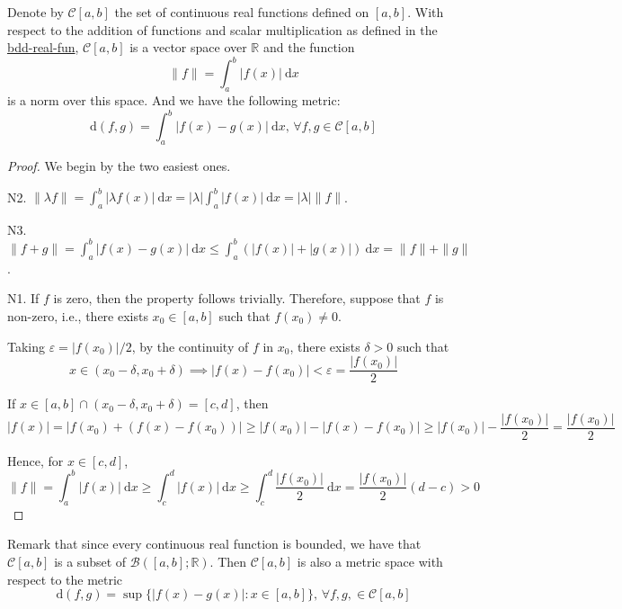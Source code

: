 \begin{proposition}
	Denote by $\mathcal{C}[a,b]$ the set of continuous real functions defined on $[a,b]$. With respect to the addition of functions and scalar multiplication as defined in the \hyperref[last proposition]{bdd-real-fun}, $\mathcal{C}[a,b]$ is a vector space over $\mathbb{R}$ and the function
	\begin{equation*}
		\| f \| = \int_a^b |f(x)| ~\mathrm{\mathrm{d}}x
	\end{equation*}
	is a norm over this space. And we have the following metric:
	\begin{equation*}
		\mathrm{d}(f,g) = \int_a^b | f(x) - g(x) | ~\mathrm{\mathrm{d}}x, \, \forall f,g \in \mathcal{C}[a,b]
	\end{equation*}
\end{proposition}

\begin{proof}
	We begin by the two easiest ones.
	
	N2. $\| \lambda f \| = \int_a^b |\lambda f(x)| ~\mathrm{d}x = |\lambda| \int_a^b |f(x)| ~\mathrm{d}x = |\lambda| \| f \|$.
	
	N3. $\| f + g\| = \int_a^b |f(x) - g(x)| ~\mathrm{d}x \leq \int_a^b (|f(x)| + |g(x)|) ~\mathrm{d}x = \| f \| + \| g \|$.
	
	N1. If $f$ is zero, then the property follows trivially. Therefore, suppose that $f$ is non-zero, i.e., there exists $x_0 \in [a,b]$ such that $f(x_0) \neq 0$. 
	
	Taking $\varepsilon = |f(x_0)|/2$, by the continuity of $f$ in $x_0$, there exists $\delta > 0$ such that
	\[
		x \in (x_0 - \delta, x_0 + \delta) \implies |f(x) - f(x_0)| < \varepsilon = \frac{|f(x_0)|}{2}
	\]
	
	If $x \in [a,b] \cap (x_0 - \delta, x_0 + \delta) = [c,d]$, then
	\[
		|f(x)| = |f(x_0) + (f(x) - f(x_0))| \geq |f(x_0)| - |f(x) - f(x_0)| \geq |f(x_0)| - \frac{|f(x_0)|}{2} = \frac{|f(x_0)|}{2}
	\]
	
	Hence, for $x \in [c,d]$,
	\[
		\| f \| = \int_a^b |f(x)| ~\mathrm{d}x \geq \int_c^d |f(x)| ~\mathrm{d}x \geq \int_c^d \frac{|f(x_0)|}{2} ~\mathrm{d}x = \frac{|f(x_0)|}{2} (d-c) > 0
	\]
\end{proof}

Remark that since every continuous real function is bounded, we have that $\mathcal{C}[a,b]$ is a subset of $\mathcal{B}([a,b]; \mathbb{R})$. Then $\mathcal{C}[a,b]$ is also a metric space with respect to the metric
\[
	\mathrm{d}(f,g) = \sup \{ |f(x) - g(x)| : x \in [a,b] \}, \, \forall f,g, \in \mathcal{C}[a,b]
\]

